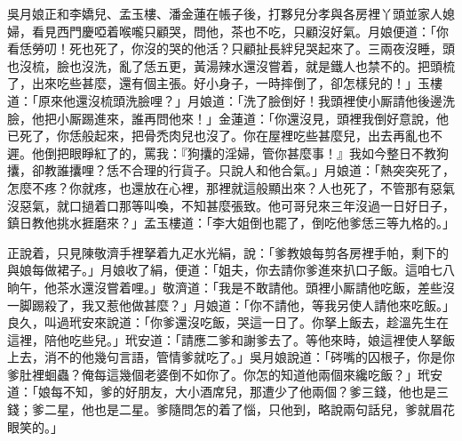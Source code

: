 吳月娘正和李嬌兒、孟玉樓、潘金蓮在帳子後，打夥兒分孝與各房裡丫頭並家人媳婦，看見西門慶啞着喉嚨只顧哭，問他，茶也不吃，只顧沒好氣。月娘便道：「你看恁勞叨！死也死了，你沒的哭的他活？只顧扯長絆兒哭起來了。三兩夜沒睡，頭也沒梳，臉也沒洗，亂了恁五更，黃湯辣水還沒嘗着，就是鐵人也禁不的。{}把頭梳了，出來吃些甚麼，還有個主張。好小身子，一時摔倒了，卻怎樣兒的！」玉樓道：「原來他還沒梳頭洗臉哩？」{}月娘道：「洗了臉倒好！我頭裡使小厮請他後邊洗臉，他把小厮踢進來，誰再問他來！」金蓮道：「你還沒見，頭裡我倒好意說，他已死了，你恁般起來，把骨禿肉兒也沒了。你在屋裡吃些甚麼兒，出去再亂也不遲。他倒把眼睜紅了的，罵我：『狗攮的淫婦，管你甚麼事！』我如今整日不教狗攮，卻教誰攮哩？恁不合理的行貨子。只說人和他合氣。」{}月娘道：「熱突突死了，怎麼不疼？{}你就疼，也還放在心裡，那裡就這般顯出來？人也死了，不管那有惡氣沒惡氣，就口撾着口那等叫喚，不知甚麼張致。他可哥兒來三年沒過一日好日子，鎮日教他挑水捱磨來？」{}孟玉樓道：「李大姐倒也罷了，{}倒吃他爹恁三等九格的。」

正說着，只見陳敬濟手裡拏着九疋水光絹，說：「爹教娘每剪各房裡手帕，剩下的與娘每做裙子。」月娘收了絹，便道：「姐夫，你去請你爹進來扒口子飯。這咱七八晌午，他茶水還沒嘗着哩。」敬濟道：「我是不敢請他。頭裡小厮請他吃飯，差些沒一脚踢殺了，{}我又惹他做甚麼？」月娘道：「你不請他，等我另使人請他來吃飯。」良久，叫過玳安來說道：「你爹還沒吃飯，哭這一日了。你拏上飯去，趁溫先生在這裡，陪他吃些兒。」玳安道：「請應二爹和謝爹去了。等他來時，娘這裡使人拏飯上去，消不的他幾句言語，管情爹就吃了。」吳月娘說道：「硶嘴的囚根子，你是你爹肚裡蛔蟲？俺每這幾個老婆倒不如你了。你怎的知道他兩個來纔吃飯？」玳安道：「娘每不知，爹的好朋友，大小酒席兒，那遭少了他兩個？爹三錢，他也是三錢；爹二星，他也是二星。爹隨問怎的着了惱，只他到，略說兩句話兒，爹就眉花眼笑的。」

